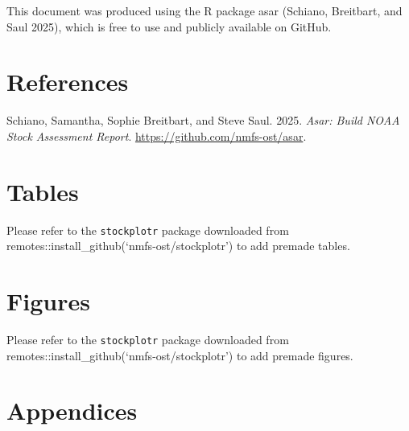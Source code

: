 \documentclass[
]{scrartcl}
\newlength{\cslhangindent}
\newenvironment{CSLReferences}[2] %
 {\begin{list}{}{%
  \setlength{\itemindent}{0pt}
  \setlength{\leftmargin}{0pt}
  \setlength{\parsep}{0pt}
  \ifodd #1
   \setlength{\leftmargin}{\cslhangindent}
   \setlength{\itemindent}{-1\cslhangindent}
  \fi
  \setlength{\itemsep}{#2\baselineskip}}}
 {\end{list}}
\begin{document}
This document was produced using the R package asar (Schiano, Breitbart,
and Saul 2025), which is free to use and publicly available on GitHub.

\newpage{}

\section{References}\label{sec-refs}

\label{refs}
\begin{CSLReferences}{1}{0}
Schiano, Samantha, Sophie Breitbart, and Steve Saul. 2025. \emph{Asar:
Build NOAA Stock Assessment Report}.
\url{https://github.com/nmfs-ost/asar}.

\end{CSLReferences}

\newpage{}

\section{Tables}\label{tables}

Please refer to the \texttt{stockplotr} package downloaded from
remotes::install\_github(`nmfs-ost/stockplotr') to add premade tables.

\newpage{}

\section{Figures}\label{figures}

Please refer to the \texttt{stockplotr} package downloaded from
remotes::install\_github(`nmfs-ost/stockplotr') to add premade figures.

\newpage{}

\appendix
\setcounter{figure}{0}
\setcounter{table}{0}

\section{Appendices}\label{sec-appendix}
\end{document}
